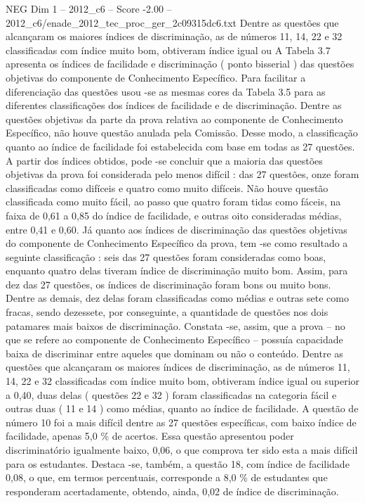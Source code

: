 \begin{textsample}{NEG Dim 1 – 2012\_c6 – Score -2.00 – 2012\_c6/enade\_2012\_tec\_proc\_ger\_2c09315dc6.txt}
Dentre as questões que alcançaram os maiores índices de discriminação, as de números 11, 14, 22 e 32 classificadas com índice muito bom, obtiveram índice igual ou A Tabela 3.7 apresenta os índices de facilidade e discriminação ( ponto bisserial ) das questões objetivas do componente de Conhecimento Específico.
Para facilitar a diferenciação das questões usou -se as mesmas cores da Tabela 3.5 para as diferentes classificações dos índices de facilidade e de discriminação.
Dentre as questões objetivas da parte da prova relativa ao componente de Conhecimento Específico, não houve questão anulada pela Comissão.
Desse modo, a classificação quanto ao índice de facilidade foi estabelecida com base em todas as 27 questões.
A partir dos índices obtidos, pode -se concluir que a maioria das questões objetivas da prova foi considerada pelo menos difícil : das 27 questões, onze foram classificadas como difíceis e quatro como muito difíceis.
Não houve questão classificada como muito fácil, ao passo que quatro foram tidas como fáceis, na faixa de 0,61 a 0,85 do índice de facilidade, e outras oito consideradas médias, entre 0,41 e 0,60.
Já quanto aos índices de discriminação das questões objetivas do componente de Conhecimento Específico da prova, tem -se como resultado a seguinte classificação : seis das 27 questões foram consideradas como boas, enquanto quatro delas tiveram índice de discriminação muito bom.
Assim, para dez das 27 questões, os índices de discriminação foram bons ou muito bons.
Dentre as demais, dez delas foram classificadas como médias e outras sete como fracas, sendo dezessete, por conseguinte, a quantidade de questões nos dois patamares mais baixos de discriminação.
Constata -se, assim, que a prova – no que se refere ao componente de Conhecimento Específico – possuía capacidade baixa de discriminar entre aqueles que dominam ou não o conteúdo.
Dentre as questões que alcançaram os maiores índices de discriminação, as de números 11, 14, 22 e 32 classificadas com índice muito bom, obtiveram índice igual ou superior a 0,40, duas delas ( questões 22 e 32 ) foram classificadas na categoria fácil e outras duas ( 11 e 14 ) como médias, quanto ao índice de facilidade.
A questão de número 10 foi a mais difícil dentre as 27 questões específicas, com baixo índice de facilidade, apenas 5,0 \% de acertos.
Essa questão apresentou poder discriminatório igualmente baixo, 0,06, o que comprova ter sido esta a mais difícil para os estudantes.
Destaca -se, também, a questão 18, com índice de facilidade 0,08, o que, em termos percentuais, corresponde a 8,0 \% de estudantes que responderam acertadamente, obtendo, ainda, 0,02 de índice de discriminação.

\end{textsample}
